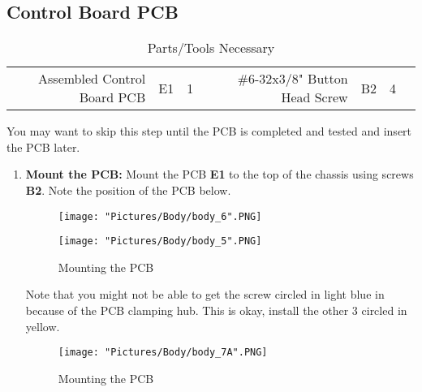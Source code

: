 \documentclass[12pt]{article}
\begin{document}
\subsection{Control Board PCB}

\begin{table}[H]
    \centering
    \sffamily\footnotesize
    \caption{Parts/Tools Necessary}
    \begin{tabular}{|N|Q|Q|I|N|Q|Q|I|}
        \hline
         &  &  &  &  &  &  &  \\
        \hline
        Assembled Control Board PCB & E1 & 1 &  & \#6-32x3/8" Button Head Screw & B2 & 4 &  \\ \hline
    \end{tabular}
\end{table}

You may want to skip this step until the PCB is completed and tested and insert the PCB later. 

\begin{enumerate}

\item \textbf{Mount the PCB:} Mount the PCB \textbf{E1} to the top of the chassis using screws \textbf{B2}. Note the position of the PCB below.

\begin{figure}[H]
  \centering
  \begin{minipage}[b]{0.50\textwidth}
    \texttt{[image: "Pictures/Body/body\_6".PNG]}
  \end{minipage}
  \hfill
  \begin{minipage}[b]{0.40\textwidth}
    \texttt{[image: "Pictures/Body/body\_5".PNG]}
  \end{minipage}
  \caption{Mounting the PCB}
  \label{pcb}
\end{figure}

Note that you might not be able to get the screw circled in light blue in because of the PCB clamping hub. This is okay, install the other 3 circled in yellow. 

\begin{figure}[H]
	\centering
	\texttt{[image: "Pictures/Body/body\_7A".PNG]}
	\caption{Mounting the PCB}
\end{figure}

\end{enumerate}
\end{document}

